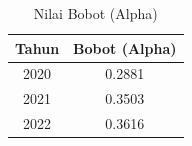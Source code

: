 \begin{table}[H]
\centering
\caption{Nilai Bobot (Alpha)} \label{tab:alpha}
\begin{tabular}{|c|c|}
\hline
\textbf{Tahun} & \textbf{Bobot (Alpha)} \\
\hline
2020 & 0.2881 \\
2021 & 0.3503 \\
2022 & 0.3616 \\
\hline
\end{tabular}
\end{table}